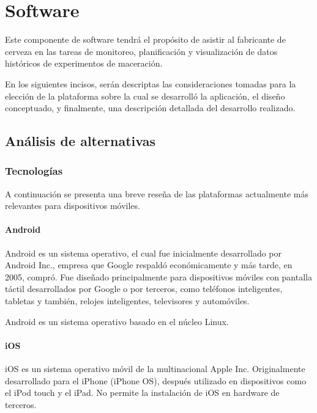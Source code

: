 \chapter{Software}
\par Este componente de software tendrá el propósito de asistir al fabricante de cerveza en las tareas de monitoreo, planificación y visualización de datos históricos de experimentos de maceración.

\par En los siguientes incisos, serán descriptas las consideraciones tomadas para la elección de la plataforma sobre la cual se desarrolló la aplicación, el diseño conceptuado, y finalmente, una descripción detallada del desarrollo realizado.

\section{Análisis de alternativas}
    \subsection{Tecnologías}
        \par A continuación se presenta una breve reseña de las plataformas actualmente más relevantes para dispositivos móviles.
        
        \subsubsection{Android}
            \par Android es un sistema operativo, el cual fue inicialmente desarrollado por Android Inc., empresa que Google respaldó económicamente y más tarde, en 2005, compró. Fue diseñado principalmente para dispositivos móviles con pantalla táctil desarrollados por Google o por terceros, como teléfonos inteligentes, tabletas y también, relojes inteligentes, televisores y automóviles. 
            
            \par Android es un sistema operativo basado en el núcleo Linux.
            
        \subsubsection{iOS}
            \par iOS es un sistema operativo móvil de la multinacional Apple Inc. Originalmente desarrollado para el iPhone (iPhone OS), después utilizado en dispositivos como el iPod touch y el iPad. No permite la instalación de iOS en hardware de terceros.
            
